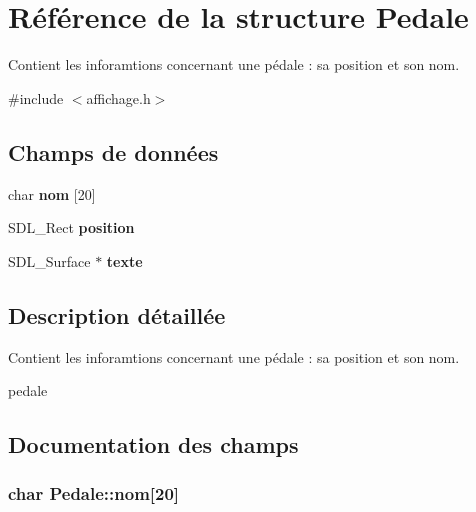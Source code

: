 \hypertarget{structPedale}{}\section{Référence de la structure Pedale}
\label{structPedale}


Contient les inforamtions concernant une pédale \+: sa position et son nom.  




{\ttfamily \#include $<$affichage.\+h$>$}

\subsection*{Champs de données}
\begin{DoxyCompactItemize}
\item 
char {\bfseries nom} \mbox{[}20\mbox{]}\hypertarget{structPedale_abe76a0a74cb780af8d9f2c19bf9f54b6}{}\label{structPedale_abe76a0a74cb780af8d9f2c19bf9f54b6}

\item 
S\+D\+L\+\_\+\+Rect {\bfseries position}\hypertarget{structPedale_aedc7c00a855b7bfbe5eb30343cfd0db3}{}\label{structPedale_aedc7c00a855b7bfbe5eb30343cfd0db3}

\item 
S\+D\+L\+\_\+\+Surface $\ast$ {\bfseries texte}\hypertarget{structPedale_a9cd599cf3cfc349479da33be6b72d465}{}\label{structPedale_a9cd599cf3cfc349479da33be6b72d465}

\end{DoxyCompactItemize}


\subsection{Description détaillée}
Contient les inforamtions concernant une pédale \+: sa position et son nom. 

pedale 

\subsection{Documentation des champs}
\subsubsection[{\texorpdfstring{nom}{nom}}]{\setlength{\rightskip}{0pt plus 5cm}char Pedale\+::nom\mbox{[}20\mbox{]}}\hypertarget{structPedale_abe76a0a74cb780af8d9f2c19bf9f54b6}{}\label{structPedale_abe76a0a74cb780af8d9f2c19bf9f54b6}
